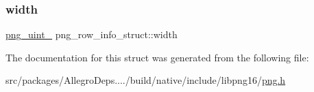 \mbox{\label{structpng__row__info__struct_a1ab107da5ffee8100eeaa76cc5ba3e62}} 
\subsubsection{\texorpdfstring{width}{width}}
{\footnotesize\ttfamily \hyperlink{libpng16_2pngconf_8h_aed373ad2e16fd6df7ccfa96329441d0d}{png\+\_\+uint\+\_} png\+\_\+row\+\_\+info\+\_\+struct\+::width}



The documentation for this struct was generated from the following file\+:\begin{DoxyCompactItemize}
\item 
src/packages/\+Allegro\+Deps..../build/native/include/libpng16/\hyperlink{libpng16_2png_8h}{png.\+h}\end{DoxyCompactItemize}
